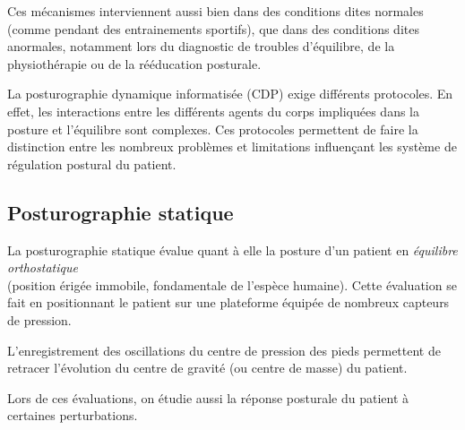 Ces mécanismes interviennent aussi bien dans des conditions dites normales (comme pendant des entrainements sportifs), que dans des conditions dites anormales, notamment lors du diagnostic de troubles d'équilibre, de la physiothérapie ou de la rééducation posturale.

La posturographie dynamique informatisée (CDP) exige différents protocoles.
En effet, les interactions entre les différents agents du corps impliquées dans la posture et l’équilibre sont complexes.
Ces protocoles permettent de faire la distinction entre les nombreux problèmes et limitations influençant les système de régulation postural du patient.

\subsection{Posturographie statique}

La posturographie statique évalue quant à elle la posture d'un patient en \textit{équilibre orthostatique} \\ (position érigée immobile, fondamentale de l'espèce humaine).
Cette évaluation se fait en positionnant le patient sur une plateforme équipée de nombreux capteurs de pression.

L'enregistrement des oscillations du centre de pression des pieds permettent de retracer l'évolution du centre de gravité (ou centre de masse) du patient.

Lors de ces évaluations, on étudie aussi la réponse posturale du patient à certaines perturbations.
